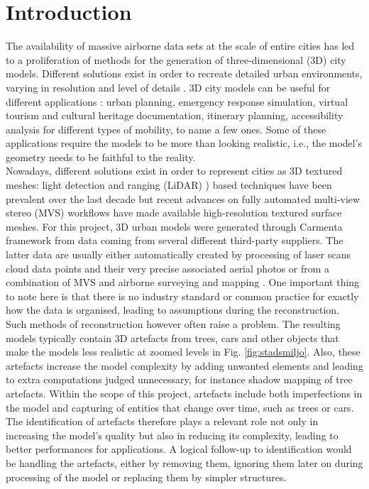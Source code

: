 \documentclass{kththesis}
\begin{document}
\chapter{Introduction}
The availability of massive airborne data sets at the scale of entire
cities has led to a proliferation of methods for the generation of three-dimensional (3D) city models. Different solutions exist in order to recreate detailed urban environments, varying in resolution and level of details \parencite{UrbanReconstructionSurvey}. 3D city models can be useful for different applications \parencite{applications3D}: urban planning, emergency response simulation, 
virtual tourism and cultural heritage documentation, itinerary planning,
accessibility analysis for different types of mobility, to name a few ones. Some of these applications require the models to be more than looking realistic, i.e., the model's geometry needs to be faithful to the reality. \\
Nowadays, different solutions exist in order to represent cities as 3D textured meshes: light detection and ranging (LiDAR) \parencite{lidarpage}) based techniques have been prevalent over the last decade but recent advances on fully automated multi-view stereo (MVS) workflows have made available high-resolution textured surface meshes. For this project,  3D urban models were generated through Carmenta framework from data coming from several different third-party suppliers. The latter data are usually either automatically created by processing of laser scans cloud data points and their very precise associated aerial photos or from a combination of MVS and airborne surveying and mapping \parencite{acute3D}.  One important thing to note here is that there is no industry standard or common practice for exactly how the data is organised, leading to assumptions during the reconstruction. %
\\ Such methods of reconstruction however often raise a problem. The resulting models typically contain 3D artefacts from trees, cars and other objects that make the models less realistic at zoomed levels in Fig. \ref{fig:stadsmiljo}. Also, these artefacts increase the model complexity by adding unwanted elements and leading  to extra computations judged unnecessary, for instance shadow mapping of tree artefacts. Within the scope of this project, artefacts include both imperfections in the model and capturing of entities that change over time, such as trees or cars. \\
The identification of artefacts therefore plays a relevant role not only in increasing the model's quality but also in reducing its complexity, leading to better performances for applications. A logical follow-up to identification would be handling the artefacts, either by removing them, ignoring them later on during processing of the model or replacing them by simpler structures. \\
\end{document}
